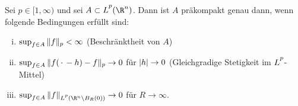 \begin{thSatz}
    \label{vl27:kompaktLp}
    Sei $p\in[1,\infty)$ und sei $A\subset\Lpp(\R^n)$. Dann ist $A$ präkompakt
    genau dann, wenn folgende Bedingungen erfüllt sind:
    \begin{enumerate}[(i)]
        \item \label{vl27:kompaktLp:i}
            $\sup_{f\in A} \, \lVert f\rVert_p < \infty$\hfill
            (Beschränktheit von $A$)
        \item \label{vl27:kompaktLp:ii}
            $\sup_{f\in A} \, \lVert f(\,\cdot\,-h)-f\rVert_p \to 0$ für
            $\lvert h\rvert\to0$\hfill
            (Gleichgradige Stetigkeit im $\Lpp$-Mittel)
        \item \label{vl27:kompaktLp:iii}
            $\sup_{f\in A} \, \norm{f}_{\Lpp(\R^n\setminus B_R(0))} \to 0$
            für $R\to\infty$.
    \end{enumerate}
\end{thSatz}

